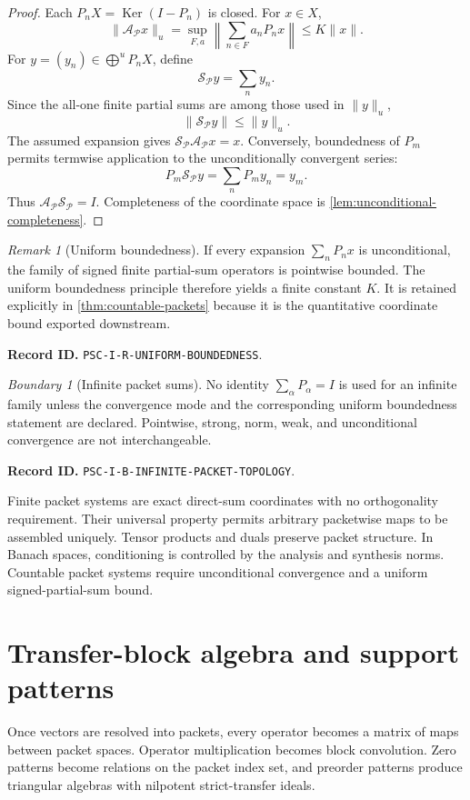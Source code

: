 \documentclass[11pt]{article}
\theoremstyle{definition}
\theoremstyle{remark}
\newtheorem{boundary}[boundary]{Boundary}
\newtheorem{remark}[remark]{Remark}
\newcommand{\Pcal}{\mathcal P}
\newcommand{\Ker}{\operatorname{Ker}}
\newcommand{\RecordID}[1]{\par\smallskip\noindent\begingroup\footnotesize\color{PSCGray}\raggedright\textbf{Record ID.} \nolinkurl{#1}.\par\endgroup}
\begin{document}
\begin{proof}
Each $P_nX=\Ker(I-P_n)$ is closed.  For $x\in X$,
\[
\|\mathcal A_{\Pcal}x\|_u
=
\sup_{F,a}
\left\|\sum_{n\in F}a_nP_nx\right\|
\leq K\|x\|.
\]
For $y=(y_n)\in\bigoplus^uP_nX$, define
\[
\mathcal S_{\Pcal}y=\sum_ny_n.
\]
Since the all-one finite partial sums are among those used in $\|y\|_u$,
\[
\|\mathcal S_{\Pcal}y\|
\leq\|y\|_u.
\]
The assumed expansion gives $\mathcal S_{\Pcal}\mathcal A_{\Pcal}x=x$.  Conversely, boundedness of $P_m$ permits termwise application to the unconditionally convergent series:
\[
P_m\mathcal S_{\Pcal}y
=
\sum_nP_my_n
=y_m.
\]
Thus $\mathcal A_{\Pcal}\mathcal S_{\Pcal}=I$.  Completeness of the coordinate space is \cref{lem:unconditional-completeness}.
\end{proof}

\begin{remark}[Uniform boundedness]
\label{rem:uniform-boundedness}
If every expansion $\sum_nP_nx$ is unconditional, the family of signed finite partial-sum operators is pointwise bounded.  The uniform boundedness principle therefore yields a finite constant $K$.  It is retained explicitly in \cref{thm:countable-packets} because it is the quantitative coordinate bound exported downstream.
\end{remark}
\RecordID{PSC-I-R-UNIFORM-BOUNDEDNESS}

\begin{boundary}[Infinite packet sums]
\label{bnd:infinite-packet-topology}
No identity $\sum_\alpha P_\alpha=I$ is used for an infinite family unless the convergence mode and the corresponding uniform boundedness statement are declared.  Pointwise, strong, norm, weak, and unconditional convergence are not interchangeable.
\end{boundary}
\RecordID{PSC-I-B-INFINITE-PACKET-TOPOLOGY}

\begin{sectionrecap}
Finite packet systems are exact direct-sum coordinates with no orthogonality requirement.  Their universal property permits arbitrary packetwise maps to be assembled uniquely.  Tensor products and duals preserve packet structure.  In Banach spaces, conditioning is controlled by the analysis and synthesis norms.  Countable packet systems require unconditional convergence and a uniform signed-partial-sum bound.
\end{sectionrecap}


\section{Transfer-block algebra and support patterns}
\begin{readerroadmap}
Once vectors are resolved into packets, every operator becomes a matrix of maps between packet spaces.  Operator multiplication becomes block convolution.  Zero patterns become relations on the packet index set, and preorder patterns produce triangular algebras with nilpotent strict-transfer ideals.
\end{readerroadmap}
\end{document}
